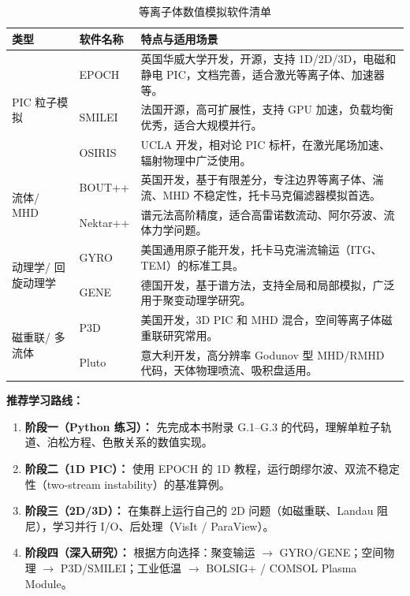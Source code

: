 \begin{table}[htbp]
\centering
\caption{等离子体数值模拟软件清单}
\label{tab:software}
\begin{tabular}{@{}p{2.8cm}p{3.5cm}p{6.5cm}@{}}
\toprule
\textbf{类型} & \textbf{软件名称} & \textbf{特点与适用场景} \\
\midrule
\multirow{3}{2.8cm}{PIC 粒子模拟} & EPOCH & 英国华威大学开发，开源，支持 1D/2D/3D，电磁和静电 PIC，文档完善，适合激光等离子体、加速器等。 \\
 & SMILEI & 法国开源，高可扩展性，支持 GPU 加速，负载均衡优秀，适合大规模并行。 \\
 & OSIRIS & UCLA 开发，相对论 PIC 标杆，在激光尾场加速、辐射物理中广泛使用。 \\
\midrule
\multirow{2}{2.8cm}{流体/ MHD} & BOUT++ & 英国开发，基于有限差分，专注边界等离子体、湍流、MHD 不稳定性，托卡马克偏滤器模拟首选。 \\
 & Nektar++ & 谱元法高阶精度，适合高雷诺数流动、阿尔芬波、流体力学问题。 \\
\midrule
\multirow{2}{2.8cm}{动理学/ 回旋动理学} & GYRO & 美国通用原子能开发，托卡马克湍流输运（ITG、TEM）的标准工具。 \\
 & GENE & 德国开发，基于谱方法，支持全局和局部模拟，广泛用于聚变动理学研究。 \\
\midrule
\multirow{2}{2.8cm}{磁重联/ 多流体} & P3D & 美国开发，3D PIC 和 MHD 混合，空间等离子体磁重联研究常用。 \\
 & Pluto & 意大利开发，高分辨率 Godunov 型 MHD/RMHD 代码，天体物理喷流、吸积盘适用。 \\
\bottomrule
\end{tabular}
\end{table}

\begin{tip}
\textbf{推荐学习路线：}
\begin{enumerate}
\item \textbf{阶段一（Python 练习）：} 先完成本书附录 G.1--G.3 的代码，理解单粒子轨道、泊松方程、色散关系的数值实现。
\item \textbf{阶段二（1D PIC）：} 使用 EPOCH 的 1D 教程，运行朗缪尔波、双流不稳定性（two-stream instability）的基准算例。
\item \textbf{阶段三（2D/3D）：} 在集群上运行自己的 2D 问题（如磁重联、Landau 阻尼），学习并行 I/O、后处理（VisIt / ParaView）。
\item \textbf{阶段四（深入研究）：} 根据方向选择：聚变输运 $\to$ GYRO/GENE；空间物理 $\to$ P3D/SMILEI；工业低温 $\to$ BOLSIG+ / COMSOL Plasma Module。
\end{enumerate}
\end{tip}


